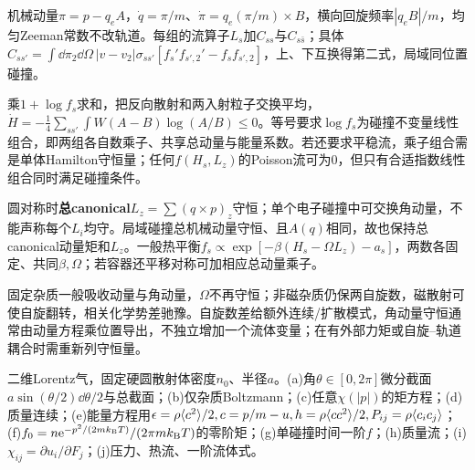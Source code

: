 \begin{solution}
机械动量$\pi=p-q_eA$，$\dot q=\pi/m$、$\dot\pi=q_e(\pi/m)\times B$，横向回旋频率$|q_eB|/m$，均匀Zeeman常数不改轨道。每组的流算子$L_s$加$C_{ss}$与$C_{s\bar s}$；具体$C_{ss'}=\int\dd\pi_2\dd\Omega\,|v-v_2|\sigma_{ss'}[f_s'f_{s',2}'-f_sf_{s',2}]$，上、下互换得第二式，局域同位置碰撞。

乘$1+\log f_s$求和，把反向散射和两入射粒子交换平均，$\dot H=-\tfrac14\sum_{ss'}\int W(A-B)\log(A/B)\le0$。等号要求$\log f_s$为碰撞不变量线性组合，即两组各自数乘子、共享总动量与能量系数。若还要求平稳流，乘子组合需是单体Hamilton守恒量；任何$f(H_s,L_z)$的Poisson流可为0，但只有合适指数线性组合同时满足碰撞条件。

圆对称时\textbf{总canonical}$L_z=\sum(q\times p)_z$守恒；单个电子碰撞中可交换角动量，不能声称每个$L_i$均守。局域碰撞总机械动量守恒、且$A(q)$相同，故也保持总canonical动量矩和$L_z$。一般热平衡$f_s\propto\exp[-\beta(H_s-\Omega L_z)-a_s]$，两数各固定、共同$\beta,\Omega$；若容器还平移对称可加相应总动量乘子。

固定杂质一般吸收动量与角动量，$\Omega$不再守恒；非磁杂质仍保两自旋数，磁散射可使自旋翻转，相关化学势差驰豫。自旋数差给额外连续/扩散模式，角动量守恒通常由动量方程乘位置导出，不独立增加一个流体变量；在有外部力矩或自旋--轨道耦合时需重新列守恒量。
\end{solution}
\begin{exercise}[原题6(a)--(j)]\label{r:333-2-6}
二维Lorentz气，固定硬圆散射体密度$n_0$、半径$a$。(a)角$\theta\in[0,2\pi]$微分截面$a\sin(\theta/2)\dd\theta/2$与总截面；(b)仅杂质Boltzmann；(c)任意$\chi(|p|)$的矩方程；(d)质量连续；(e)能量方程用$\epsilon=\rho\langle c^2\rangle/2,c=p/m-u,h=\rho\langle cc^2\rangle/2,P_{ij}=\rho\langle c_ic_j\rangle$；(f)$f_0=n\mathrm e^{-p^2/(2mk_{\mathrm B} T)}/(2\pi mk_{\mathrm B} T)$的零阶矩；(g)单碰撞时间一阶$f$；(h)质量流；(i)$\chi_{ij}=\partial u_i/\partial F_j$；(j)压力、热流、一阶流体式。
\end{exercise}
